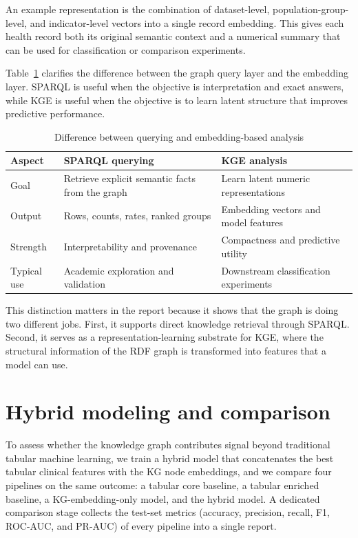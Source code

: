 \documentclass[11pt,a4paper]{article}
\begin{document}
An example representation is the combination of dataset-level, population-group-level, and indicator-level vectors into a single record embedding. This gives each health record both its original semantic context and a numerical summary that can be used for classification or comparison experiments.

Table~\ref{tab:kge-compare} clarifies the difference between the graph query layer and the embedding layer. SPARQL is useful when the objective is interpretation and exact answers, while KGE is useful when the objective is to learn latent structure that improves predictive performance.

\begin{table}[ht]
\centering
\begin{tabular}{|p{4.2cm}|p{5.3cm}|p{3.2cm}|}
\hline
\textbf{Aspect} & \textbf{SPARQL querying} & \textbf{KGE analysis} \\ \hline
Goal & Retrieve explicit semantic facts from the graph & Learn latent numeric representations \\ \hline
Output & Rows, counts, rates, ranked groups & Embedding vectors and model features \\ \hline
Strength & Interpretability and provenance & Compactness and predictive utility \\ \hline
Typical use & Academic exploration and validation & Downstream classification experiments \\ \hline
\end{tabular}
\caption{Difference between querying and embedding-based analysis}
\label{tab:kge-compare}
\end{table}

This distinction matters in the report because it shows that the graph is doing two different jobs. First, it supports direct knowledge retrieval through SPARQL. Second, it serves as a representation-learning substrate for KGE, where the structural information of the RDF graph is transformed into features that a model can use.

\section{Hybrid modeling and comparison}
To assess whether the knowledge graph contributes signal beyond traditional tabular machine learning, we train a hybrid model that concatenates the best tabular clinical features with the KG node embeddings, and we compare four pipelines on the same outcome: a tabular core baseline, a tabular enriched baseline, a KG-embedding-only model, and the hybrid model. A dedicated comparison stage collects the test-set metrics (accuracy, precision, recall, F1, ROC-AUC, and PR-AUC) of every pipeline into a single report.
\end{document}
